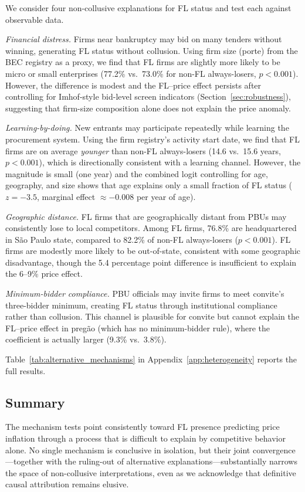 We consider four non-collusive explanations for FL status and test each
against observable data.

\emph{Financial distress.} Firms near bankruptcy may bid on many tenders
without winning, generating FL status without collusion. Using firm size
(porte) from the BEC registry as a proxy, we find that FL firms are
slightly more likely to be micro or small enterprises (77.2\% vs.\
73.0\% for non-FL always-losers, $p < 0.001$). However, the difference
is modest and the FL--price effect persists after controlling for
Imhof-style bid-level screen indicators (Section~\ref{sec:robustness}),
suggesting that firm-size composition alone does not explain the price
anomaly.

\emph{Learning-by-doing.} New entrants may participate repeatedly while
learning the procurement system. Using the firm registry's activity start
date, we find that FL firms are on average \emph{younger} than non-FL
always-losers (14.6 vs.\ 15.6 years, $p < 0.001$), which is
directionally consistent with a learning channel. However, the magnitude
is small (one year) and the combined logit controlling for age,
geography, and size shows that age explains only a small fraction of FL
status ($z = -3.5$, marginal effect $\approx -0.008$ per year of age).

\emph{Geographic distance.} FL firms that are geographically distant
from PBUs may consistently lose to local competitors. Among FL firms,
76.8\% are headquartered in S\~ao Paulo state, compared to 82.2\% of
non-FL always-losers ($p < 0.001$). FL firms are modestly more likely
to be out-of-state, consistent with some geographic disadvantage, though
the 5.4 percentage point difference is insufficient to explain the
6--9\% price effect.

\emph{Minimum-bidder compliance.} PBU officials may invite firms to
meet convite's three-bidder minimum, creating FL status through
institutional compliance rather than collusion. This channel is
plausible for convite but cannot explain the FL--price effect in
preg\~ao (which has no minimum-bidder rule), where the coefficient is
actually larger (9.3\% vs.\ 3.8\%).

Table~\ref{tab:alternative_mechanisms} in
Appendix~\ref{app:heterogeneity} reports the full results.

\subsection{Summary}

The mechanism tests point consistently toward FL presence predicting
price inflation through a process that is difficult to explain by
competitive behavior alone. No single mechanism is conclusive in
isolation, but their joint convergence---together with the ruling-out of
alternative explanations---substantially narrows the space of non-collusive
interpretations, even as we acknowledge that definitive causal
attribution remains elusive.
